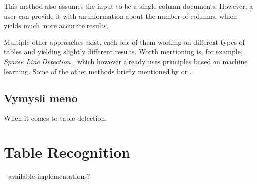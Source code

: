 This method also assumes the input to be a single-column documents. However, a user can provide it with an information about the number of columns, which yields much more accurate results.

Multiple other approaches exist, each one of them working on different types of tables and yielding slightly different results. Worth mentioning is, for example, \emph{Sparse Line Detection} \cite{sparseLineDetection}, which however already uses principles based on machine learning. Some of the other methods briefly mentioned by \citet{otherDetection1} or \citet{otherDetection2}.

\subsection{Vymysli meno}

When it comes to table detection, 


\section{Table Recognition}

- available implementations? 






